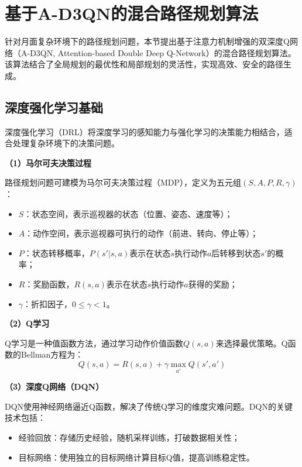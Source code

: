 \section{基于A-D3QN的混合路径规划算法}
\label{sec:ad3qn}

针对月面复杂环境下的路径规划问题，本节提出基于注意力机制增强的双深度Q网络（A-D3QN, Attention-based Double Deep Q-Network）的混合路径规划算法。该算法结合了全局规划的最优性和局部规划的灵活性，实现高效、安全的路径生成。

\subsection{深度强化学习基础}
\label{subsec:drl_base}

深度强化学习（DRL）将深度学习的感知能力与强化学习的决策能力相结合，适合处理复杂环境下的决策问题。

\textbf{（1）马尔可夫决策过程}

路径规划问题可建模为马尔可夫决策过程（MDP），定义为五元组$(S, A, P, R, \gamma)$：
\begin{itemize}
    \item $S$：状态空间，表示巡视器的状态（位置、姿态、速度等）；
    \item $A$：动作空间，表示巡视器可执行的动作（前进、转向、停止等）；
    \item $P$：状态转移概率，$P(s'|s,a)$表示在状态$s$执行动作$a$后转移到状态$s'$的概率；
    \item $R$：奖励函数，$R(s,a)$表示在状态$s$执行动作$a$获得的奖励；
    \item $\gamma$：折扣因子，$0 \le \gamma < 1$。
\end{itemize}

\textbf{（2）Q学习}

Q学习是一种值函数方法，通过学习动作价值函数$Q(s,a)$来选择最优策略。Q函数的Bellman方程为：
\begin{equation}
    Q(s,a) = R(s,a) + \gamma \max_{a'} Q(s',a')
    \label{eq:q_learning}
\end{equation}

\textbf{（3）深度Q网络（DQN）}

DQN使用神经网络逼近Q函数，解决了传统Q学习的维度灾难问题。DQN的关键技术包括：
\begin{itemize}
    \item 经验回放：存储历史经验，随机采样训练，打破数据相关性；
    \item 目标网络：使用独立的目标网络计算目标Q值，提高训练稳定性。
\end{itemize}

